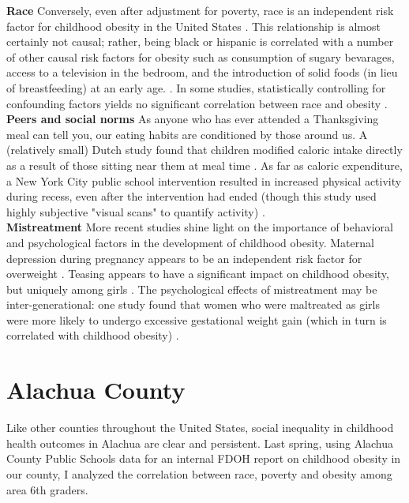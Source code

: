 \begin{multicols}{2}
\textbf{Race} Conversely, even after adjustment for poverty, race is an independent risk factor for childhood obesity in the United States \cite{Ogden2014}.  This relationship is almost certainly not causal; rather, being black or hispanic is correlated with a number of other causal risk factors for obesity such as consumption of sugary bevarages, access to a television in the bedroom, and the introduction of solid foods (in lieu of breastfeeding) at an early age. \cite{Taveras2010}.  In some studies, statistically controlling for confounding factors yields no significant correlation between race and obesity \cite{Zilanawala2014}.   \\

\textbf{Peers and social norms} As anyone who has ever attended a Thanksgiving meal can tell you, our eating habits are conditioned by those around us.  A (relatively small) Dutch study found that children modified caloric intake directly as a result of those sitting near them at meal time \cite{Bevelander2012}.  As far as caloric expenditure, a New York City public school intervention resulted in increased physical activity during recess, even after the intervention had ended (though this study used highly subjective "visual scans" to quantify activity)  \cite{Chin2013}. \\

\textbf{Mistreatment} More recent studies shine light on the importance of behavioral and psychological factors in the development of childhood obesity.  Maternal depression during pregnancy appears to be an independent risk factor for overweight \cite{Taveras2010}.  Teasing appears to have a significant impact on childhood obesity, but uniquely among girls \cite{Feeg2014}. The psychological effects of mistreatment may be inter-generational: one study found that women who were maltreated as girls were more likely to undergo excessive gestational weight gain (which in turn is correlated with childhood obesity) \cite{Diesel2014}.

\section*{Alachua County}
Like other counties throughout the United States, social inequality in childhood health outcomes in Alachua are clear and persistent.  Last spring, using Alachua County Public Schools data for an internal FDOH report on childhood obesity in our county, I analyzed the correlation between race, poverty and obesity among area 6th graders. %


\end{multicols}

